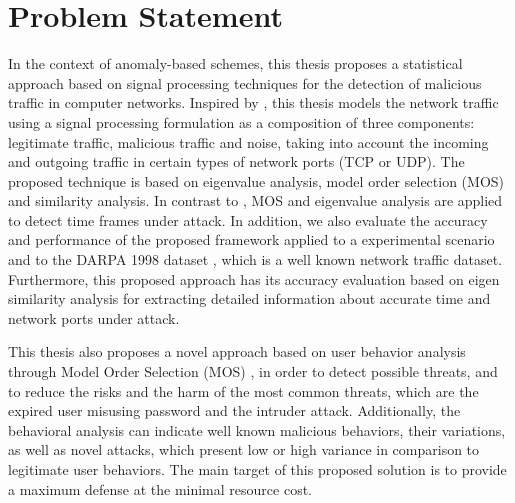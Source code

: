 

\section{Problem Statement}
\label{sc:problems}

In the context of anomaly-based schemes, this thesis proposes a statistical approach based on signal processing techniques for the detection of malicious traffic in computer networks. Inspired by \cite{david2011blind,da2012improved}, this thesis models the network traffic using a signal processing formulation as a composition of three components: legitimate traffic, malicious traffic and noise, taking into account the incoming and outgoing traffic in certain types of network ports (TCP or UDP). The proposed technique is based on eigenvalue analysis, model order selection (MOS) and similarity analysis. In contrast to \cite{david2011blind,da2012improved,tenorio2013greatest}, MOS and eigenvalue analysis are applied to detect time frames under attack. In addition, we also evaluate the accuracy and performance of the proposed framework applied to a experimental scenario and to the DARPA 1998 dataset \citep{osanaiye2016distributed}, which is a well known network traffic dataset. Furthermore, this proposed approach has its accuracy evaluation based on eigen similarity analysis for extracting detailed information about accurate time and network ports under attack. 

This thesis also proposes a novel approach based on user behavior analysis through Model Order Selection (MOS) \cite{tenorio2013greatest}, in order to detect possible threats, and to reduce the risks and the harm of the most common threats, which are the expired user misusing password and the intruder attack. Additionally, the behavioral analysis can indicate well known malicious behaviors, their variations, as well as novel attacks, which present low or high variance in comparison to legitimate user behaviors. The main target of this proposed solution is to provide a maximum defense at the minimal resource cost.

